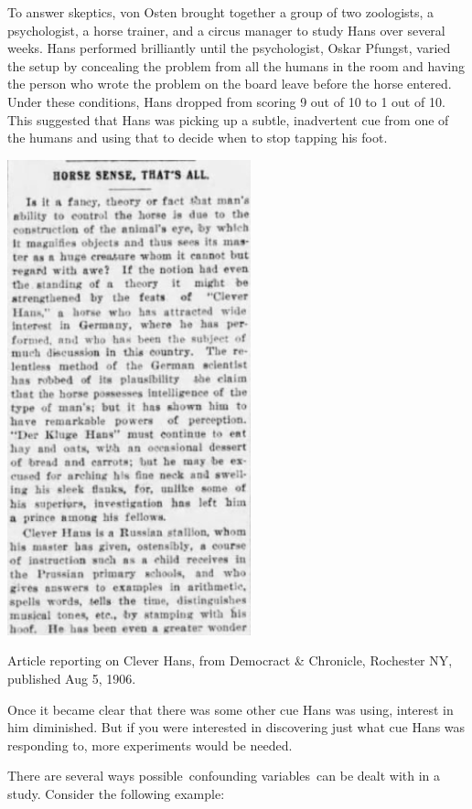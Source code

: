\begin{refsection}
To answer skeptics, von Osten brought together a group of two zoologists, a psychologist, a horse trainer, and a circus manager to study Hans over several weeks. Hans performed brilliantly until the psychologist, Oskar Pfungst, varied the setup by concealing the problem from all the humans in the room and having the person who wrote the problem on the board leave before the horse entered. Under these conditions, Hans dropped from scoring 9 out of 10 to 1 out of 10. This suggested that Hans was picking up a subtle, inadvertent cue from one of the humans and using that to decide when to stop tapping his foot.\begin{marginfigure}
\begin{center}\includegraphics{../images/cleverhansarticle.png}\end{center}
\caption{Article reporting on Clever Hans, from Democract & Chronicle, Rochester NY, published Aug 5, 1906.}
\label{fig:cleverhansarticle}
\end{marginfigure}

Once it became clear that there was some other cue Hans was using, interest in him diminished. But if you were interested in discovering just what cue Hans was responding to, more experiments would be needed. 

There are several ways possible confounding variables can be dealt with in a study. Consider the following example:


\end{refsection}
